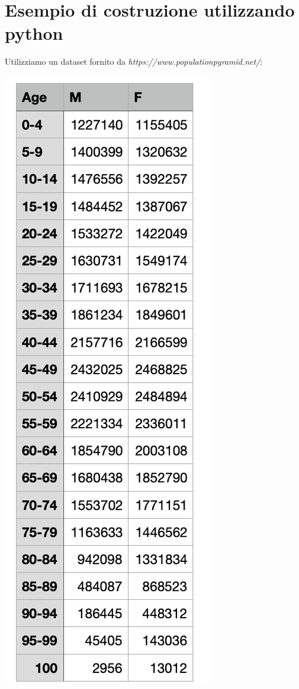 \documentclass[11pt, oneside]{article}   	%
\begin{document}
\section{Esempio di costruzione utilizzando python}
Utilizziamo un dataset fornito da \emph{https://www.populationpyramid.net/}:
\begin{center}
\includegraphics[scale=0.6]{popitaly}
\end{center}
\end{document}
